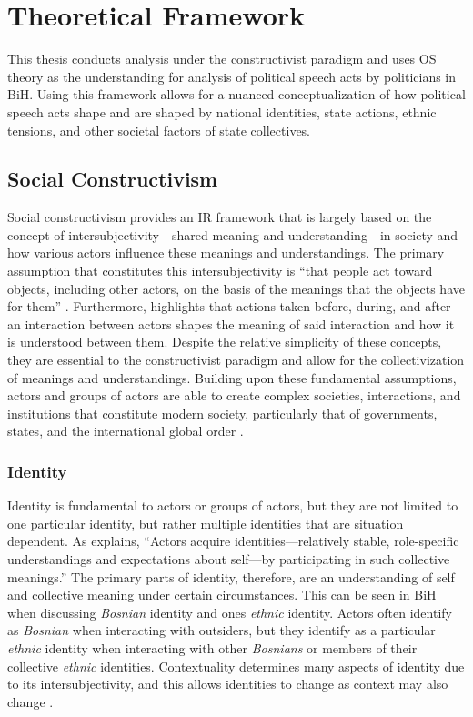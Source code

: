 
\chapter{Theoretical Framework}
\label{chap:two}

This thesis conducts analysis under the constructivist paradigm and uses \ac{OS} theory as the understanding for analysis of political speech acts by politicians in \ac{BiH}. Using this framework allows for a nuanced conceptualization of how political speech acts shape and are shaped by national identities, state actions, ethnic tensions, and other societal factors of state collectives.

\section{Social Constructivism}
\label{sec:constructivism}

Social constructivism provides an \ac{IR} framework that is largely based on the concept of intersubjectivity---shared meaning and understanding---in society and how various actors influence these meanings and understandings. The primary assumption that constitutes this intersubjectivity is ``that people act toward objects, including other actors, on the basis of the meanings that the objects have for them'' \citep[pg.~396-397]{wendt1992}. Furthermore, \citet[pg.~404.405]{wendt1992} highlights that actions taken before, during, and after an interaction between actors shapes the meaning of said interaction and how it is understood between them. Despite the relative simplicity of these concepts, they are essential to the constructivist paradigm and allow for the collectivization of meanings and understandings. Building upon these fundamental assumptions, actors and groups of actors are able to create complex societies, interactions, and institutions that constitute modern society, particularly that of governments, states, and the international global order \citep[pg.~401-402]{wendt1992}.

\subsection{Identity}
\label{subsec:identity}

Identity is fundamental to actors or groups of actors, but they are not limited to one particular identity, but rather multiple identities that are situation dependent. As \citet[pg.~397]{wendt1992} explains, ``Actors acquire identities---relatively stable, role-specific understandings and expectations about self---by participating in such collective meanings.'' The primary parts of identity, therefore, are an understanding of self and collective meaning under certain circumstances. This can be seen in \ac{BiH} when discussing \textit{Bosnian} identity and ones \textit{ethnic} identity. Actors often identify as \textit{Bosnian} when interacting with outsiders, but they identify as a particular \textit{ethnic} identity when interacting with other \textit{Bosnians} or members of their collective \textit{ethnic} identities. Contextuality determines many aspects of identity due to its intersubjectivity, and this allows identities to change as context may also change \citep[pg.~397-398]{wendt1992}.

